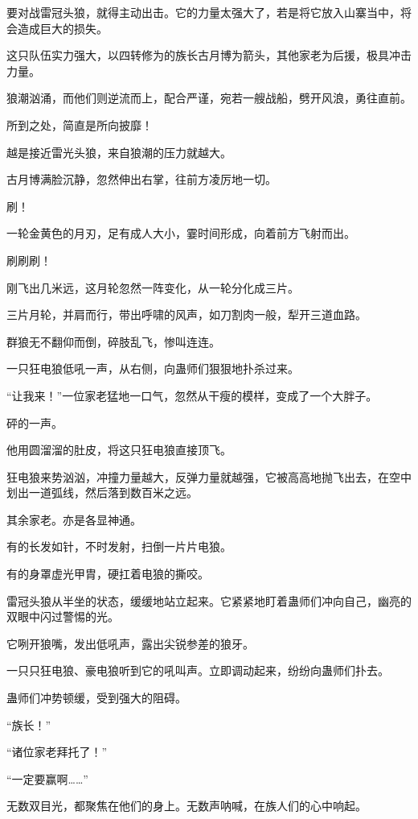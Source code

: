 
\begin{this_body}

要对战雷冠头狼，就得主动出击。它的力量太强大了，若是将它放入山寨当中，将会造成巨大的损失。

这只队伍实力强大，以四转修为的族长古月博为箭头，其他家老为后援，极具冲击力量。

狼潮汹涌，而他们则逆流而上，配合严谨，宛若一艘战船，劈开风浪，勇往直前。

所到之处，简直是所向披靡！

越是接近雷光头狼，来自狼潮的压力就越大。

古月博满脸沉静，忽然伸出右掌，往前方凌厉地一切。

刷！

一轮金黄色的月刃，足有成人大小，霎时间形成，向着前方飞射而出。

刷刷刷！

刚飞出几米远，这月轮忽然一阵变化，从一轮分化成三片。

三片月轮，并肩而行，带出呼啸的风声，如刀割肉一般，犁开三道血路。

群狼无不翻仰而倒，碎肢乱飞，惨叫连连。

一只狂电狼低吼一声，从右侧，向蛊师们狠狠地扑杀过来。

“让我来！”一位家老猛地一口气，忽然从干瘦的模样，变成了一个大胖子。

砰的一声。

他用圆溜溜的肚皮，将这只狂电狼直接顶飞。

狂电狼来势汹汹，冲撞力量越大，反弹力量就越强，它被高高地抛飞出去，在空中划出一道弧线，然后落到数百米之远。

其余家老。亦是各显神通。

有的长发如针，不时发射，扫倒一片片电狼。

有的身罩虚光甲胄，硬扛着电狼的撕咬。

雷冠头狼从半坐的状态，缓缓地站立起来。它紧紧地盯着蛊师们冲向自己，幽亮的双眼中闪过警惕的光。

它咧开狼嘴，发出低吼声，露出尖锐参差的狼牙。

一只只狂电狼、豪电狼听到它的吼叫声。立即调动起来，纷纷向蛊师们扑去。

蛊师们冲势顿缓，受到强大的阻碍。

“族长！”

“诸位家老拜托了！”

“一定要赢啊……”

无数双目光，都聚焦在他们的身上。无数声呐喊，在族人们的心中响起。


\end{this_body}
